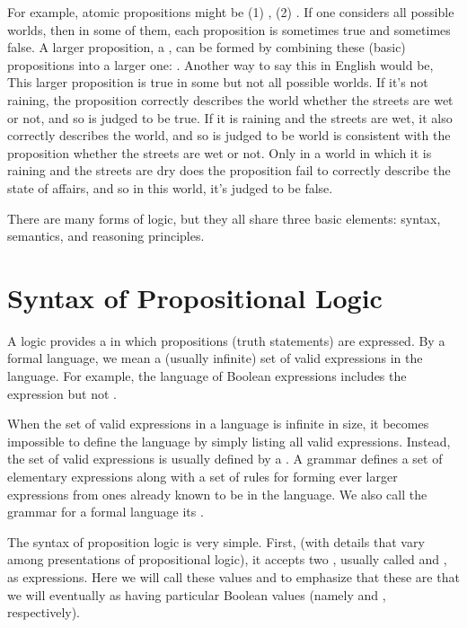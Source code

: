 \documentclass[letterpaper,10pt,english]{sphinxmanual}
\begin{document}
For example, atomic propositions might be (1) , (2)
. If one considers all possible worlds, then in
some of them, each proposition is sometimes true and sometimes false.
A larger proposition, a , can be formed by combining these
(basic) propositions into a larger one:  
. Another way to say this in English would be,
 This larger proposition
is true in some but not all possible worlds. If it’s not raining, the
proposition correctly describes the world whether the streets are wet
or not, and so is judged to be true. If it is raining and the streets
are wet, it also correctly describes the world, and so is judged to be
world is consistent with the proposition whether the streets are wet
or not. Only in a world in which it is raining and the streets are dry
does the proposition fail to correctly describe the state of affairs,
and so in this world, it’s judged to be false.

There are many forms of logic, but they all share three basic
elements: syntax, semantics, and reasoning principles.


\section{Syntax of Propositional Logic}
\label{\detokenize{09-propositional-logic:syntax-of-propositional-logic}}
A logic provides a  in which propositions (truth
statements) are expressed. By a formal language, we mean a (usually
infinite) set of valid expressions in the language. For example, the
language of Boolean expressions includes the expression  but not .

When the set of valid expressions in a language is infinite in size,
it becomes impossible to define the language by simply listing all
valid expressions. Instead, the set of valid expressions is usually
defined  by a . A grammar defines a set of
elementary expressions along with a set of rules for forming ever
larger expressions from ones already known to be in the language. We
also call the grammar for a formal language its .

The syntax of proposition logic is very simple. First, (with details
that vary among presentations of propositional logic), it accepts two
, usually called  and , as expressions.
Here we will call these values  and  to emphasize that
these are  that we will eventually  as having
particular Boolean values (namely  and , respectively).
\end{document}
